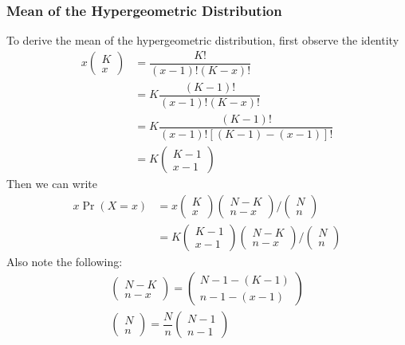 \documentclass[11pt]{report} %
\begin{document}
\subsubsection{Mean of the Hypergeometric Distribution}

To derive the mean of the hypergeometric distribution, first observe the identity
\begin{align}
x\begin{pmatrix}K\\
x
\end{pmatrix} &= \dfrac{K!}{\left(x-1\right)!\left(K-x\right)!} \\
&= K\dfrac{\left(K-1\right)!}{\left(x-1\right)!\left(K-x\right)!} \\
&= K\dfrac{\left(K-1\right)!}{\left(x-1\right)!\left[\left(K-1\right)-\left(x-1\right)\right]!} \\
&= K\begin{pmatrix}K-1\\
x-1
\end{pmatrix}
\end{align}
Then we can write
\begin{align}
x\operatorname{Pr}\left(X=x\right) &= x\begin{pmatrix}K\\
x
\end{pmatrix}\begin{pmatrix}N-K\\
n-x
\end{pmatrix}/\begin{pmatrix}N\\
n
\end{pmatrix} \\
&= K\begin{pmatrix}K-1\\
x-1
\end{pmatrix}\begin{pmatrix}N-K\\
n-x
\end{pmatrix}/\begin{pmatrix}N\\
n
\end{pmatrix}
\end{align}
Also note the following:
\begin{gather}
\begin{pmatrix}N-K\\
n-x
\end{pmatrix}=\begin{pmatrix}N-1-\left(K-1\right)\\
n-1-\left(x-1\right)
\end{pmatrix} \\
\begin{pmatrix}N\\
n
\end{pmatrix}=\dfrac{N}{n}\begin{pmatrix}N-1\\
n-1
\end{pmatrix}
\end{gather}
\end{document}
